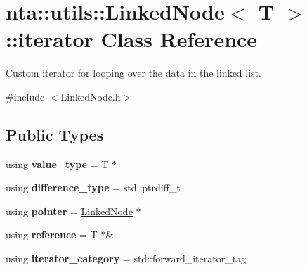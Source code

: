 \hypertarget{classnta_1_1utils_1_1LinkedNode_1_1iterator}{}\section{nta\+:\+:utils\+:\+:Linked\+Node$<$ T $>$\+:\+:iterator Class Reference}
\label{classnta_1_1utils_1_1LinkedNode_1_1iterator}


Custom iterator for looping over the data in the linked list.  




{\ttfamily \#include $<$Linked\+Node.\+h$>$}

\subsection*{Public Types}
\begin{DoxyCompactItemize}
\item 
\mbox{\label{classnta_1_1utils_1_1LinkedNode_1_1iterator_af592822b7d6005099cb20ec796267d9a}} 
using {\bfseries value\+\_\+type} = T $\ast$
\item 
\mbox{\label{classnta_1_1utils_1_1LinkedNode_1_1iterator_a1b3b2d988c4997992b47ea9498a1035a}} 
using {\bfseries difference\+\_\+type} = std\+::ptrdiff\+\_\+t
\item 
\mbox{\label{classnta_1_1utils_1_1LinkedNode_1_1iterator_a54252e4bdbc7c4d15a5ac7a399c434d2}} 
using {\bfseries pointer} = \hyperlink{structnta_1_1utils_1_1LinkedNode}{Linked\+Node} $\ast$
\item 
\mbox{\label{classnta_1_1utils_1_1LinkedNode_1_1iterator_ab77af839fd7d7d42a80a107030f5ae44}} 
using {\bfseries reference} = T $\ast$\&
\item 
\mbox{\label{classnta_1_1utils_1_1LinkedNode_1_1iterator_a58d6cf3fe58f6a9a34198d72e754ae3d}} 
using {\bfseries iterator\+\_\+category} = std\+::forward\+\_\+iterator\+\_\+tag
\end{DoxyCompactItemize}
